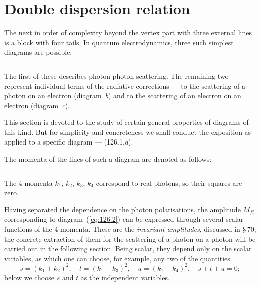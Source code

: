 
\section{Double dispersion relation}


The next in order of complexity beyond the vertex part with three external lines is a block with four tails. In quantum electrodynamics, three such simplest diagrams are possible:

\begin{equation}
\label{eq:126.1}
\end{equation}

The first of these describes photon-photon scattering. The remaining two represent individual terms of the radiative corrections --- to the scattering of a photon on an electron (diagram~\textit{b}) and to the scattering of an electron on an electron (diagram~\textit{c}).


This section is devoted to the study of certain general properties of diagrams of this kind. But for simplicity and concreteness we shall conduct the exposition as applied to a specific diagram --- (126.1,\textit{a}).

The momenta of the lines of such a diagram are denoted as follows:

\begin{equation}
\label{eq:126.2}
\end{equation}

The 4-momenta $k_1$, $k_2$, $k_3$, $k_4$ correspond to real photons, so their squares are zero.

Having separated the dependence on the photon polarisations, the amplitude $M_{fi}$ corresponding to diagram~(\ref{eq:126.2}) can be expressed through several scalar functions of the 4-momenta. These are the \emph{invariant amplitudes}, discussed in \S\,70; the concrete extraction of them for the scattering of a photon on a photon will be carried out in the following section. Being scalar, they depend only on the scalar variables, as which one can choose, for example, any two of the quantities
\begin{equation}
s = (k_1 + k_2)^2,\quad t = (k_1 - k_3)^2,\quad u = (k_1 - k_4)^2,\quad s + t + u = 0;
\label{eq:126.3}
\end{equation}
below we choose $s$ and $t$ as the independent variables.

